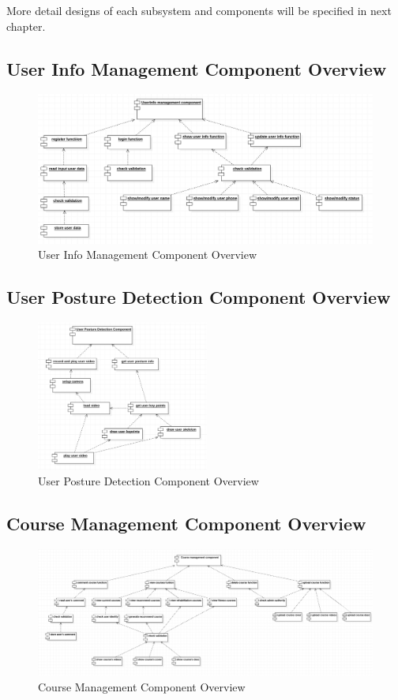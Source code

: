 \documentclass[16pt]{scrreprt}
\begin{document}
\noindent More detail designs of each subsystem and components will be specified in next chapter.
 
\subsection{User Info Management Component Overview} 
\begin{figure}[H]
  \centering
  \includegraphics[width=1\textwidth]{diagrams/userinfocom.png}
  \caption{User Info Management Component Overview}
\end{figure}

\subsection{User Posture Detection Component Overview}
\begin{figure}[H]
  \centering
  \includegraphics[width=0.505\textwidth]{diagrams/detection-com.png}
  \caption{User Posture Detection Component Overview}
\end{figure}

\subsection{Course Management Component Overview}
\begin{figure}[H]
    \centering
    \includegraphics[width=1\textwidth]{diagrams/course-management.png}
    \caption{Course Management Component Overview}
\end{figure}
\end{document}
